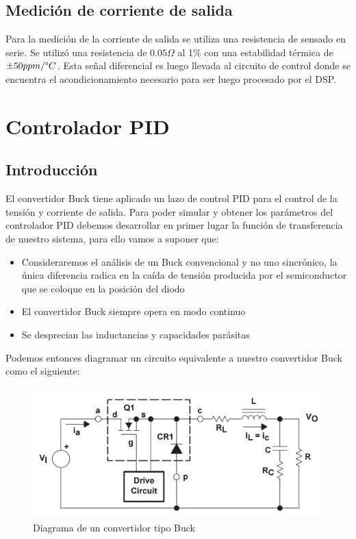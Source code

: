 \documentclass[12pt]{report}
\begin{document}
\section{Medición de corriente de salida}

	Para la medición de la corriente de salida se utiliza una resistencia de sensado en serie. Se utilizó una resistencia de $0.05 \Omega$ al 1\% con una estabilidad térmica de $\pm 50ppm/ \degree C$. Esta señal diferencial es luego llevada al circuito de control donde se encuentra el acondicionamiento necesario para ser luego procesado por el DSP.

\chapter{Controlador PID}\label{chapter:pid}

\section{Introducción}

	El convertidor Buck tiene aplicado un lazo de control PID para el control de la tensión y corriente de salida. Para poder simular y obtener los parámetros del controlador PID debemos desarrollar en primer lugar la función de transferencia de nuestro sistema, para ello vamos a suponer que:
	
	\begin{itemize}
		\item Consideraremos el análisis de un Buck convencional y no uno sincrónico, la única diferencia radica en la caída de tensión producida por el semiconductor que se coloque en la posición del diodo
		\item El convertidor Buck siempre opera en modo continuo
		\item Se desprecian las inductancias y capacidades parásitas
	\end{itemize}

	Podemos entonces diagramar un circuito equivalente a nuestro convertidor Buck como el siguiente:
	
	\begin{figure}[H]
		\centering
		\includegraphics[width=\textwidth,height=\textheight,keepaspectratio]{buck_control_diagram}
		\caption{Diagrama de un convertidor tipo Buck}
		\label{buck:diagram}
	\end{figure}
\end{document}
